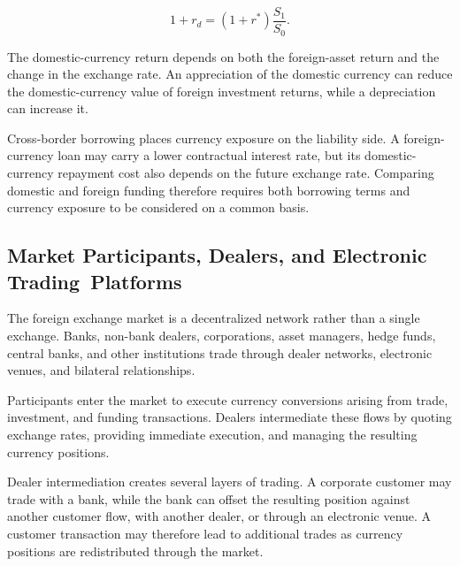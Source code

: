 \begin{equation}
1+r_d=(1+r^{*})\frac{S_1}{S_0}.
\label{eq:ch10-foreign-investment-return}
\end{equation}

The domestic-currency return depends on both the foreign-asset return and the change in the exchange rate. An appreciation of the domestic currency can reduce the domestic-currency value of foreign investment returns, while a depreciation can increase it.

Cross-border borrowing places currency exposure on the liability side. A foreign-currency loan may carry a lower contractual interest rate, but its domestic-currency repayment cost also depends on the future exchange rate. Comparing domestic and foreign funding therefore requires both borrowing terms and currency exposure to be considered on a common basis.

\subsection[Market Participants, Dealers, and Electronic Trading Platforms]{Market Participants, Dealers, and Electronic Trading\ Platforms}

The foreign exchange market is a decentralized network rather than a single exchange. Banks, non-bank dealers, corporations, asset managers, hedge funds, central banks, and other institutions trade through dealer networks, electronic venues, and bilateral relationships.

Participants enter the market to execute currency
conversions arising from trade, investment, and
funding transactions. Dealers intermediate these
flows by quoting exchange rates, providing immediate
execution, and managing the resulting currency
positions.

Dealer intermediation creates several layers of trading. A corporate customer may trade with a bank, while the bank can offset the resulting position against another customer flow, with another dealer, or through an electronic venue. A customer transaction may therefore lead to additional trades as currency positions are redistributed through the market.

